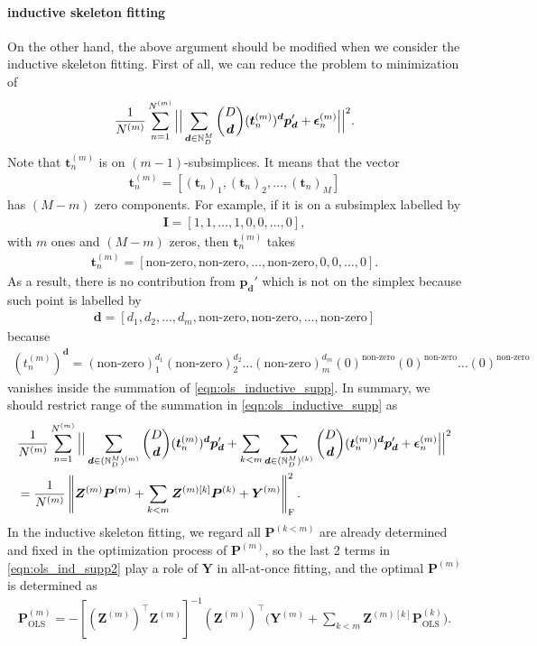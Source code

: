 \documentclass{article}
\begin{document}
\paragraph{inductive skeleton fitting}
On the other hand, the above argument should be modified when we consider the inductive skeleton fitting.
First of all, we can reduce the problem to minimization of
\begin{align}
\frac{1}{N^{(m)}}
\sum_{n=1}^{N^{(m)}}
\Big| \Big|
\sum_{\bm d \in \mathbb{N}_D^M}
\binom{D}{\bm d} (\bm t_n^{(m)})^{\bm d}
\bm p_{\bm d}'
+
\bm \epsilon_n^{(m)}
\Big| \Big|^2.
\label{eqn:ols_inductive_supp}
\end{align}
Note that $\bm t_n^{(m)}$ is on $(m-1)$-subsimplices.
It means that the vector
\begin{align}
\bm t_n^{(m)}
=
[
(\bm t_n)_1,
(\bm t_n)_2,
\dots ,
(\bm t_n)_M
]
\end{align}
has $(M-m)$ zero components.
For example, if it is on a subsimplex labelled by
\begin{align}
\bm I = [1, 1, \dots, 1, 0, 0, \dots, 0],
\end{align}
with $m$ ones and $(M-m)$ zeros, then $\bm t_n^{(m)}$ takes
\begin{align}
\bm t_n^{(m)}
=
[
\text{non-zero},
\text{non-zero},
\dots ,
\text{non-zero},
0,
0,
\dots,
0
].
\end{align}
As a result, there is no contribution from $\bm p_{\bm d}'$ which is not on the simplex because such point is labelled by
\begin{align}
\bm d
=
[
d_1,
d_2,
\dots,
d_m,
\text{non-zero},
\text{non-zero},
\dots,
\text{non-zero}
]
\end{align}
because
\begin{align}
(t_n^{(m)})^{\bm d}
=
(\text{non-zero})_1^{d_1}
(\text{non-zero})_2^{d_2}
\dots
(\text{non-zero})_m^{d_m}
(0)^{\text{non-zero}}
(0)^{\text{non-zero}}
\dots
(0)^{\text{non-zero}}
\end{align}
vanishes inside the summation of \cref{eqn:ols_inductive_supp}.
In summary, we should restrict range of the summation in \cref{eqn:ols_inductive_supp} as
\begin{align}
&
\frac{1}{N^{(m)}}
\sum_{n=1}^{N^{(m)}}
\Big| \Big|
\sum_{\bm d \in (\mathbb{N}_D^M)^{(m)}}
\binom{D}{\bm d} (\bm t_n^{(m)})^{\bm d}
\bm p_{\bm d}'
+
\sum_{k < m}
\sum_{\bm d \in (\mathbb{N}_D^M)^{(k)}}
\binom{D}{\bm d} (\bm t_n^{(m)})^{\bm d}
\bm p_{\bm d}'
+
\bm \epsilon_n^{(m)}
\Big| \Big|^2
\notag \\
&=
\frac{1}{N^{(m)}}
\left\| 
\bm Z^{(m)} \bm P^{(m)}
+
\sum_{k<m}
\bm Z^{(m)[k]} \bm P^{(k)}
+
\bm Y^{(m)}
 \right\|^2_\mathrm{F}.
\label{eqn:ols_ind_supp2}
\end{align}
In the inductive skeleton fitting, we regard all $\bm P^{(k<m)}$ are already determined and fixed in the optimization process of $\bm P^{(m)}$, so the last 2 terms in \cref{eqn:ols_ind_supp2} play a role of $\bm Y$ in all-at-once fitting, and the optimal $\bm P^{(m)}$ is determined as
\begin{align}
{\bm P}_\mathrm{OLS}^{(m)}
= %
-
[({\bm Z}^{(m)})^\top {\bm Z}^{(m)}]^{-1}
({\bm Z}^{(m)})^\top 
\Big(
{\bm Y}^{(m)}
+
\sum_{k<m}
{\bm Z}^{(m) [k]}
{\bm P}_\mathrm{OLS}^{(k)}
\Big).
\label{eqn:rec_supp}
\end{align}
\end{document}
